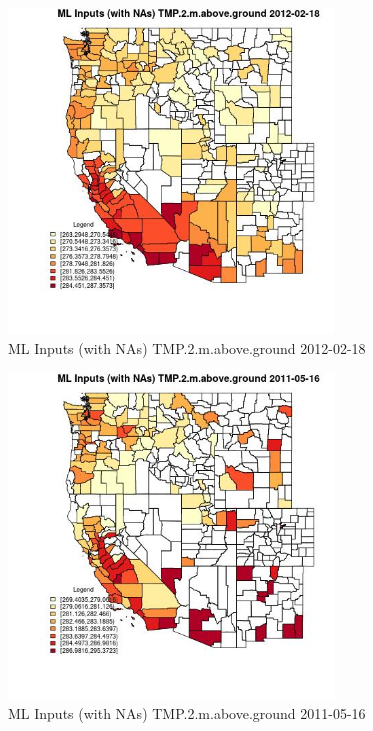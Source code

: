 \clearpage 

\begin{figure} 
\centering  
\includegraphics[width=0.77\textwidth]{Code_Outputs/Report_ML_input_PM25_Step4_part_f_de_duplicated_aveswNAs_CountyTMP2mabovegroundMean2012-02-18.jpg} 
\caption{\label{fig:Report_ML_input_PM25_Step4_part_f_de_duplicated_aveswNAsCountyTMP2mabovegroundMean2012-02-18}ML Inputs (with NAs) TMP.2.m.above.ground 2012-02-18} 
\end{figure} 
 

\begin{figure} 
\centering  
\includegraphics[width=0.77\textwidth]{Code_Outputs/Report_ML_input_PM25_Step4_part_f_de_duplicated_aveswNAs_CountyTMP2mabovegroundMean2011-05-16.jpg} 
\caption{\label{fig:Report_ML_input_PM25_Step4_part_f_de_duplicated_aveswNAsCountyTMP2mabovegroundMean2011-05-16}ML Inputs (with NAs) TMP.2.m.above.ground 2011-05-16} 
\end{figure} 
 

